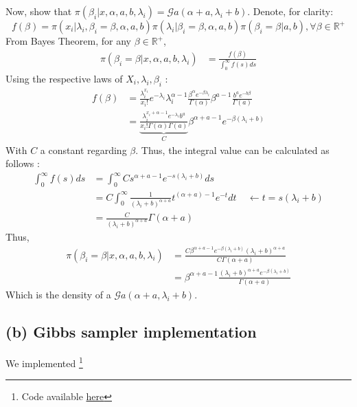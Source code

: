 \documentclass{article}
\newcommand{\R}{\mathbb R}
\begin{document}
\noindent Now, show that $\pi(\beta_i|x, \alpha, a, b, \lambda_i) =
 \mathcal{G}a(\alpha + a, \lambda_i + b)$. Denote, for clarity:  \[f(\beta) = 
 \pi(x_i | \lambda_i, \beta_i= \beta, \alpha, a, b )
        \pi(\lambda_i|\beta_i=\beta, \alpha, a, b)
        \pi(\beta_i = \beta| a, b), \forall \beta \in \R^+\]
         From Bayes Theorem, for any $\beta \in \R^+$,  
 \begin{align*}
    \pi(\beta_i = \beta | x, \alpha, a, b, \lambda_i) &=
        \frac{f(\beta)}
        {\int_0^\infty f(s)ds}  
 \end{align*}
 Using the respective laws of $X_i, \lambda_i, \beta_i$ : 
 \begin{align*}
     f(\beta) &= \frac{\lambda_i^{x_i}}{x_i!} 
                  e^{-\lambda_i}
                  \lambda_i^{\alpha-1} 
                  \frac{\beta^\alpha e^{-\beta\lambda_i} }{\Gamma(\alpha)}
                  \beta^{a-1} 
                  \frac{b^a e^{-b\beta}}{\Gamma(a)} \\
             &= \underset{C}{\underbrace{\frac{\lambda_i^{x_i+\alpha-1}e^{-\lambda_i}b^a   }
             {x_i! \Gamma(\alpha) \Gamma(a)} } }
             \beta^{\alpha+a-1}
              e^{-\beta(\lambda_i+b)}
 \end{align*}
 With $C$ a constant regarding $\beta$. Thus, the integral value can be calculated as follows :
 \begin{align*}
    \int_0^\infty f(s)ds &= \int_0^\infty C 
                            s^{\alpha+a-1}
                            e^{-s(\lambda_i+b)} ds  \\
                        &= C \int_0^\infty \frac{1}{(\lambda_i+b)^{\alpha+a} }
                            t^{(\alpha+a)-1}e^{-t} dt \ \ \ \ \ \leftarrow t = s(\lambda_i+b) \\
                        &= \frac{C}{(\lambda_i+b)^{\alpha+a} } \Gamma(\alpha +a)
 \end{align*}
 Thus, 
 \begin{align*}
     \pi(\beta_i = \beta | x, \alpha, a, b, \lambda_i) &= 
       \frac{
            C \beta^{\alpha+a-1}
            e^{-\beta(\lambda_i+b)}
            (\lambda_i+b)^{\alpha+a} 
       }
       {C \Gamma(\alpha+a)} \\
    &=  \beta^{\alpha+a-1}
    \frac{
        (\lambda_i+b)^{\alpha+a} 
        e^{-\beta(\lambda_i+b)}
   }
   { \Gamma(\alpha+a)}
 \end{align*}
Which is the density of a $\mathcal{G}a(\alpha+a, \lambda_i+b)$. 

\subsection*{(b) Gibbs sampler implementation}

We implemented \footnote{Code available \href{https://github.com/sally14/ComputationalStats/blob/master/TD3/gibbs_mastitis.ipynb}{here}} 
\end{document}
